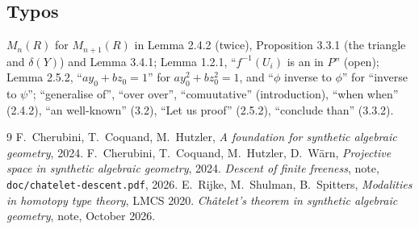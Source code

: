 \documentclass[11pt]{amsart}
\theoremstyle{definition}
\theoremstyle{remark}
\begin{document}
\subsection*{Typos}
$M_n(R)$ for $M_{n+1}(R)$ in Lemma 2.4.2 (twice), Proposition 3.3.1 (the
triangle and $\delta(Y)$) and Lemma 3.4.1; Lemma 1.2.1, ``$f^{-1}(U_i)$ is
an in $P$'' (open); Lemma 2.5.2, ``$ay_0+bz_0=1$'' for $ay_0^2+bz_0^2=1$, and
``$\phi$ inverse to $\phi$'' for ``inverse to $\psi$''; ``generalise of'',
``over over'', ``comuutative'' (introduction), ``when when'' (2.4.2), ``an
well-known'' (3.2), ``Let us proof'' (2.5.2), ``conclude than'' (3.3.2).

\begin{thebibliography}{9}
 F.~Cherubini, T.~Coquand, M.~Hutzler, \emph{A foundation for
synthetic algebraic geometry}, 2024.
 F.~Cherubini, T.~Coquand, M.~Hutzler, D.~W\"arn,
\emph{Projective space in synthetic algebraic geometry}, 2024.
 \emph{Descent of finite freeness}, note,
\texttt{doc/chatelet-descent.pdf}, 2026.
 E.~Rijke, M.~Shulman, B.~Spitters, \emph{Modalities in
homotopy type theory}, LMCS 2020.
 \emph{Ch\^atelet's theorem in synthetic algebraic geometry},
note, October 2026.
\end{thebibliography}
\end{document}
